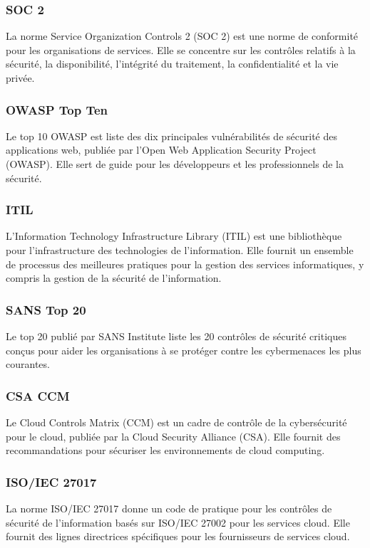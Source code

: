 \subsubsection{SOC 2}
La norme Service Organization Controls 2 (SOC 2) est une norme de conformité pour les organisations de services. Elle se concentre sur les contrôles relatifs à la sécurité, la disponibilité, l'intégrité du traitement, la confidentialité et la vie privée.
	
\subsubsection{OWASP Top Ten}
Le top 10 OWASP est liste des dix principales vulnérabilités de sécurité des applications web, publiée par l'Open Web Application Security Project (OWASP). Elle sert de guide pour les développeurs et les professionnels de la sécurité. 
	
\subsubsection{ITIL}
L'Information Technology Infrastructure Library (ITIL) est une bibliothèque pour l'infrastructure des technologies de l'information. Elle fournit un ensemble de processus des meilleures pratiques pour la gestion des services informatiques, y compris la gestion de la sécurité de l'information.
	
\subsubsection{SANS Top 20}
Le top 20 publié par SANS Institute liste les 20 contrôles de sécurité critiques conçus pour aider les organisations à se protéger contre les cybermenaces les plus courantes.

\subsubsection{CSA CCM}
Le  Cloud Controls Matrix (CCM) est un cadre de contrôle de la cybersécurité pour le cloud, publiée par la Cloud Security Alliance (CSA). Elle fournit des recommandations pour sécuriser les environnements de cloud computing.
	
\subsubsection{ISO/IEC 27017}
La norme ISO/IEC 27017 donne un code de pratique pour les contrôles de sécurité de l'information basés sur ISO/IEC 27002 pour les services cloud. Elle fournit des lignes directrices spécifiques pour les fournisseurs de services cloud.
	
